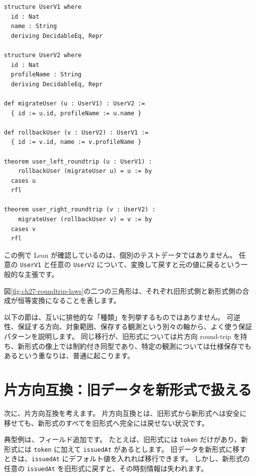 \begin{listing}[htbp]
\begin{verbatim}
structure UserV1 where
  id : Nat
  name : String
  deriving DecidableEq, Repr

structure UserV2 where
  id : Nat
  profileName : String
  deriving DecidableEq, Repr

def migrateUser (u : UserV1) : UserV2 :=
  { id := u.id, profileName := u.name }

def rollbackUser (v : UserV2) : UserV1 :=
  { id := v.id, name := v.profileName }

theorem user_left_roundtrip (u : UserV1) :
    rollbackUser (migrateUser u) = u := by
  cases u
  rfl

theorem user_right_roundtrip (v : UserV2) :
    migrateUser (rollbackUser v) = v := by
  cases v
  rfl
\end{verbatim}
\caption{\texttt{user\_left\_roundtrip} と \texttt{user\_right\_roundtrip}}
\label{lst:ch27-user-roundtrip}
\end{listing}

この例で Lean が確認しているのは、個別のテストデータではありません。
任意の \texttt{UserV1} と任意の \texttt{UserV2} について、変換して戻すと元の値に戻るという一般的な主張です。

図\ref{fig:ch27-roundtrip-laws}の二つの三角形は、それぞれ旧形式側と新形式側の合成が恒等変換になることを表します。


以下の節は、互いに排他的な「種類」を列挙するものではありません。
可逆性、保証する方向、対象範囲、保存する観測という別々の軸から、よく使う保証パターンを説明します。
同じ移行が、旧形式については片方向 round-trip を持ち、新形式の像上では制約付き同型であり、特定の観測については仕様保存でもあるという重なりは、普通に起こります。

\section{片方向互換：旧データを新形式で扱える}

次に、片方向互換を考えます。
片方向互換とは、旧形式から新形式へは安全に移せても、新形式のすべてを旧形式へ完全には戻せない状況です。

典型例は、フィールド追加です。
たとえば、旧形式には \texttt{token} だけがあり、新形式には \texttt{token} に加えて \texttt{issuedAt} があるとします。
旧データを新形式に移すときは、\texttt{issuedAt} にデフォルト値を入れれば移行できます。
しかし、新形式の任意の \texttt{issuedAt} を旧形式に戻すと、その時刻情報は失われます。

